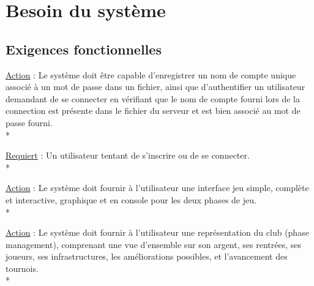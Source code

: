 \documentclass[a4paper]{article}
\begin{document}
\section{Besoin du système}
	\subsection{Exigences fonctionnelles}
		\begin{description}[style=nextline]
			\item[Vérification d'authentification :]
			\begin{description}[leftmargin=*] %
				\item[]
				\item \underline{Action} : Le système doit être capable d'enregistrer un nom de compte unique associé à un mot de passe dans un fichier, ainsi que d'authentifier un utilisateur demandant de se connecter en vérifiant que le nom de compte fourni lors de la connection est présente dans le fichier du serveur et est bien associé au mot de passe fourni.\\*
				\item \underline{Requiert} : Un utilisateur tentant de s'inscrire ou de se connecter.\\*
			\end{description}
			\item[Interface :]
			\begin{description}[leftmargin=*] %
				\item[]
				\item \underline{Action} : Le système doit fournir à l'utilisateur une interface jeu simple, complète et interactive, graphique et en console pour les deux phases de jeu.\\*
			\end{description}
			\item[Représentation phase management :]
			\begin{description}[leftmargin=*] %
				\item[]
				\item \underline{Action} : Le système doit fournir à l'utilisateur une représentation du \gls{club} (phase management), comprenant une vue d'ensemble sur son argent, ses rentrées, ses joueurs, ses infrastructures, les améliorations possibles, et l'avancement des tournois.\\*

\end{description}
\end{description}
\end{document}
